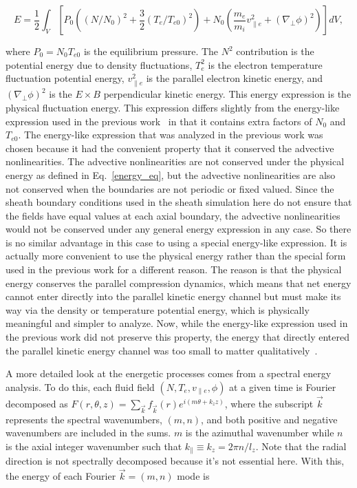 \documentclass[showpacs,preprintnumbers,amsmath,amssymb,superscriptaddress,aip]{revtex4-1}
\def\beq{\begin{equation}}
\def\eeq{\end{equation}}
\def\para{\parallel}
\def\grad{\nabla}
\newcommand{\gradperp}{\grad_\perp}
\newcommand{\vpe}{v_{\parallel e}}
\begin{document}
\beq
\label{energy_eq}
E = \frac{1}{2} \int_V  \left[ P_0 \left((N/N_0)^2 + \frac{3}{2} (T_e/T_{e0})^2 \right) + N_0 \left( \frac{m_e}{m_i} \vpe^2 + (\gradperp \phi)^2 \right) \right] dV,
\eeq

where $P_0 = N_0 T_{e0}$ is the equilibrium pressure.
The $N^2$ contribution is the potential energy due to density fluctuations, $T_e^2$ is the electron temperature fluctuation potential energy,
$\vpe^2$ is the parallel electron kinetic energy, and $(\gradperp \phi)^2$ is the $E \times B$ perpendicular kinetic energy.
This energy expression is the physical fluctuation energy. This expression differs slightly from the energy-like expression used in the previous work~\cite{friedman2012b} in that it contains
extra factors of $N_0$ and $T_{e0}$. The energy-like expression that was analyzed in the previous work was chosen because it had the convenient property that it conserved the advective nonlinearities.
The advective nonlinearities are not conserved under the physical energy as defined in Eq.~\ref{energy_eq}, but the advective nonlinearities are also not conserved when the boundaries are not
periodic or fixed valued. Since the sheath boundary conditions used in the sheath simulation here do not ensure that the fields have equal values at each axial boundary, 
the advective nonlinearities would not be conserved under any general energy expression in any case.
So there is no similar advantage in this case to using a special energy-like expression. It is actually more convenient to use the physical energy rather than the special form used in the 
previous work for a different reason. 
The reason is that the physical energy conserves the parallel compression dynamics, which means that net energy cannot enter directly into
the parallel kinetic energy channel but must make its way via the density or temperature potential energy, which is physically meaningful and simpler to analyze. 
Now, while the energy-like expression used in the previous work did not preserve this property, the energy that directly entered the parallel kinetic energy channel was too small to matter 
qualitatively~\cite{friedman2012b}.

A more detailed look at the energetic processes comes from a spectral energy analysis. To do this, each fluid field $(N,T_e,\vpe,\phi)$ at a given time is Fourier decomposed as 
$F(r,\theta,z) = \sum_{\vec{k}} f_{\vec{k}}(r) e^{i (m \theta + k_z z )}$,
where the subscript $\vec{k}$ represents the spectral wavenumbers, $(m,n)$, and both positive and negative wavenumbers are included in the sums. 
$m$ is the azimuthal wavenumber while $n$ is the axial integer wavenumber such that $k_\para \equiv k_z = 2 \pi n/l_z$. 
Note that the radial direction is not spectrally decomposed because it's not essential here.
With this, the energy of each Fourier $\vec{k} = (m,n)$ mode is
\end{document}
